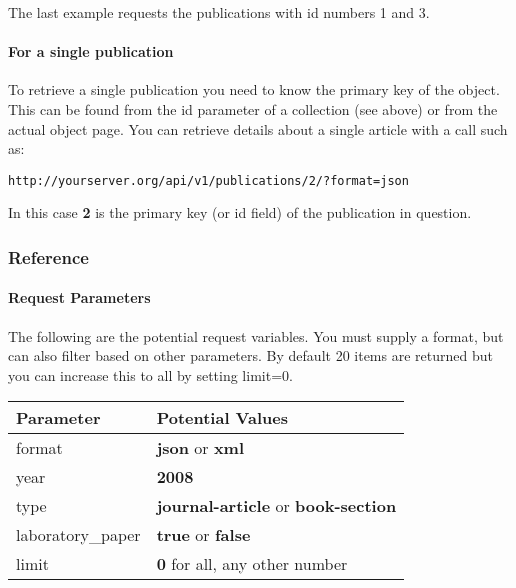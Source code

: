 \documentclass[letterpaper,10pt,english]{sphinxmanual}
\begin{document}
The last example requests the publications with id numbers 1 and 3.


\paragraph{For a single publication}
\label{papers:for-a-single-publication}
To retrieve a single publication you need to know the primary key of the object.  This can be found from the id parameter of a collection (see above) or from the actual object page.  You can retrieve details about a single article with a call such as:

\begin{Verbatim}[commandchars=\\\{\}]
http://yourserver.org/api/v1/publications/2/?format=json
\end{Verbatim}

In this case \textbf{2} is the primary key (or id field) of the publication in question.


\subsubsection{Reference}
\label{papers:reference}

\paragraph{Request Parameters}
\label{papers:request-parameters}
The following are the potential request variables.  You must supply a format, but can also filter based on other parameters.  By default 20 items are returned but you can increase this to all by setting limit=0.

\begin{tabulary}{\linewidth}{|L|L|}
\hline
\textbf{
Parameter
} & \textbf{
Potential Values
}\\\hline

format
 & 
\textbf{json} or \textbf{xml}
\\\hline

year
 & 
\textbf{2008}
\\\hline

type
 & 
\textbf{journal-article} or \textbf{book-section}
\\\hline

laboratory\_paper
 & 
\textbf{true} or \textbf{false}
\\\hline

limit
 & 
\textbf{0} for all, any other number
\\\hline
\end{tabulary}
\end{document}
